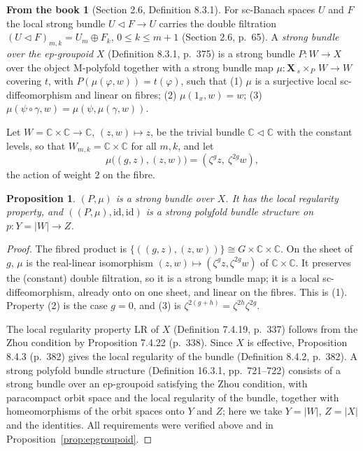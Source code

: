 \documentclass[11pt,a4paper]{article}
\theoremstyle{plain}
\newtheorem{proposition}[theorem]{Proposition}
\theoremstyle{definition}
\newtheorem{recall}[theorem]{From the book}
\theoremstyle{remark}
\newcommand{\C}{\mathbb{C}}
\newcommand{\abs}[1]{\lvert #1\rvert}
\newcommand{\id}{\mathrm{id}}
\begin{document}
\begin{recall}[Section 2.6, Definition 8.3.1]\label{rec:strongbundle}
For sc-Banach spaces $U$ and $F$ the local strong bundle $U\triangleleft F\to U$ carries the double
filtration $(U\triangleleft F)_{m,k}=U_m\oplus F_k$, $0\le k\le m+1$ (Section 2.6, p.~65). A
\emph{strong bundle over the ep-groupoid} $X$ (Definition 8.3.1, p.~375) is a strong bundle
$P\colon W\to X$ over the object M-polyfold together with a strong bundle map
$\mu\colon\mathbf X\,{}_s{\times}_P\,W\to W$ covering $t$, with $P(\mu(\varphi,w))=t(\varphi)$, such that
(1) $\mu$ is a surjective local sc-diffeomorphism and linear on fibres; (2) $\mu(1_x,w)=w$;
(3) $\mu(\psi\circ\gamma,w)=\mu(\psi,\mu(\gamma,w))$.
\end{recall}

Let $W=\C\times\C\to\C$, $(z,w)\mapsto z$, be the trivial bundle $\C\triangleleft\C$ with the constant
levels, so that $W_{m,k}=\C\times\C$ for all $m,k$, and let
\[
  \mu\bigl((g,z),(z,w)\bigr)=(\zeta^g z,\ \zeta^{2g}w),
\]
the action of weight $2$ on the fibre.

\begin{proposition}\label{prop:bundle}
$(P,\mu)$ is a strong bundle over $X$. It has the local regularity property, and
$((P,\mu),\id,\id)$ is a strong polyfold bundle structure on $p\colon Y=\abs W\to Z$.
\end{proposition}

\begin{proof}
The fibred product is $\{((g,z),(z,w))\}\cong G\times\C\times\C$. On the sheet of $g$, $\mu$ is the
real-linear isomorphism $(z,w)\mapsto(\zeta^g z,\zeta^{2g}w)$ of $\C\times\C$. It preserves the (constant)
double filtration, so it is a strong bundle map; it is a local sc-diffeomorphism, already onto on one
sheet, and linear on the fibres. This is (1). Property (2) is the case $g=0$, and (3) is
$\zeta^{2(g+h)}=\zeta^{2h}\zeta^{2g}$.

The local regularity property LR of $X$ (Definition 7.4.19, p.~337) follows from the Zhou condition by
Proposition 7.4.22 (p.~338). Since $X$ is effective, Proposition 8.4.3 (p.~382) gives the local
regularity of the bundle (Definition 8.4.2, p.~382). A strong polyfold bundle structure
(Definition 16.3.1, pp.~721--722) consists of a strong bundle over an ep-groupoid satisfying the Zhou
condition, with paracompact orbit space and the local regularity of the bundle, together with
homeomorphisms of the orbit spaces onto $Y$ and $Z$; here we take $Y=\abs W$, $Z=\abs X$ and the
identities. All requirements were verified above and in Proposition~\ref{prop:epgroupoid}.
\end{proof}
\end{document}
